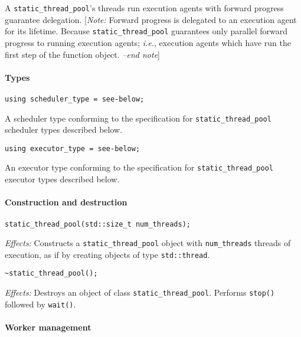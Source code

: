 \documentclass[a4paper,12pt,notitlepage,twoside,openright]{article}
\begin{document}
A \texttt{static_thread_pool}'s threads run execution agents
with forward progress guarantee delegation. {[}\emph{Note:} Forward
progress is delegated to an execution agent for its lifetime. Because
\texttt{static_thread_pool} guarantees only parallel forward
progress to running execution agents; \emph{i.e.}, execution agents
which have run the first step of the function object. \emph{--end
note}{]}

\hypertarget{types}{%
\paragraph{Types}\label{types}}

\begin{verbatim}
using scheduler_type = see-below;
\end{verbatim}

A scheduler type conforming to the specification for
\texttt{static_thread_pool} scheduler types described below.

\begin{verbatim}
using executor_type = see-below;
\end{verbatim}

An executor type conforming to the specification for
\texttt{static_thread_pool} executor types described below.

\hypertarget{construction-and-destruction}{%
\paragraph{Construction and
destruction}\label{construction-and-destruction}}

\begin{verbatim}
static_thread_pool(std::size_t num_threads);
\end{verbatim}

\emph{Effects:} Constructs a \texttt{static_thread_pool}
object with \texttt{num_threads} threads of execution, as if
by creating objects of type \texttt{std::thread}.

\begin{verbatim}
~static_thread_pool();
\end{verbatim}

\emph{Effects:} Destroys an object of class
\texttt{static_thread_pool}. Performs
\texttt{stop()} followed by \texttt{wait()}.

\hypertarget{worker-management}{%
\paragraph{Worker management}\label{worker-management}}
\end{document}
